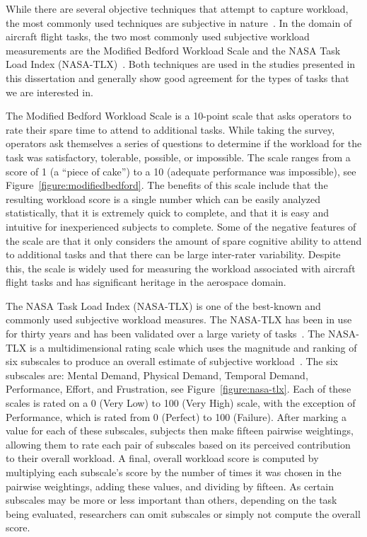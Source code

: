 While there are several objective techniques that attempt to capture workload, the most commonly used techniques are subjective in nature~\citep{hart_development_1988}.
In the domain of aircraft flight tasks, the two most commonly used subjective workload measurements are the Modified Bedford Workload Scale and the NASA Task Load Index (NASA-TLX)~\citep{roscoe_subjective_1990, hart_development_1988, hart_nasa-task_2006}.
Both techniques are used in the studies presented in this dissertation and generally show good agreement for the types of tasks that we are interested in.

The Modified Bedford Workload Scale is a 10-point scale that asks operators to rate their spare time to attend to additional tasks.
While taking the survey, operators ask themselves a series of questions to determine if the workload for the task was satisfactory, tolerable, possible, or impossible.
The scale ranges from a score of 1 (a ``piece of cake'') to a 10 (adequate performance was impossible), see Figure~\ref{figure:modifiedbedford}.
The benefits of this scale include that the resulting workload score is a single number which can be easily analyzed statistically, that it is extremely quick to complete, and that it is easy and intuitive for inexperienced subjects to complete.
Some of the negative features of the scale are that it only considers the amount of spare cognitive ability to attend to additional tasks and that there can be large inter-rater variability.
Despite this, the scale is widely used for measuring the workload associated with aircraft flight tasks and has significant heritage in the aerospace domain.

The NASA Task Load Index (NASA-TLX) is one of the best-known and commonly used subjective workload measures.
The NASA-TLX has been in use for thirty years and has been validated over a large variety of tasks~\citep{hart_nasa-task_2006}.
The NASA-TLX is a multidimensional rating scale which uses the magnitude and ranking of six subscales to produce an overall estimate of subjective workload~\citep{hart_development_1988}.
The six subscales are: Mental Demand, Physical Demand, Temporal Demand, Performance, Effort, and Frustration, see Figure~\ref{figure:nasa-tlx}.
Each of these scales is rated on a 0 (Very Low) to 100 (Very High) scale, with the exception of Performance, which is rated from 0 (Perfect) to 100 (Failure).
After marking a value for each of these subscales, subjects then make fifteen pairwise weightings, allowing them to rate each pair of subscales based on its perceived contribution to their overall workload.
A final, overall workload score is computed by multiplying each subscale's score by the number of times it was chosen in the pairwise weightings, adding these values, and dividing by fifteen.
As certain subscales may be more or less important than others, depending on the task being evaluated, researchers can omit subscales or simply not compute the overall score.

